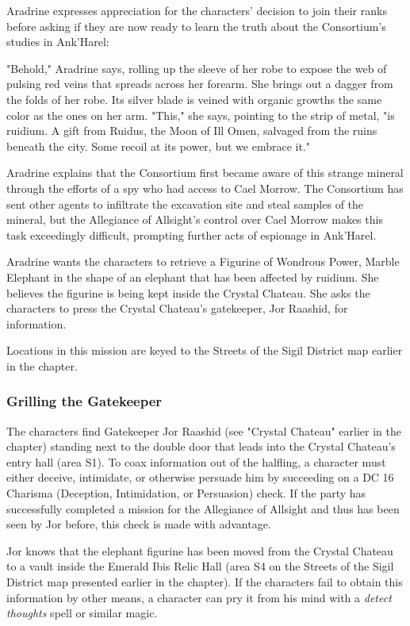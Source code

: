 \documentclass[10pt,a4paper,twoside,bg=print,twocolumn,openany,nodeprecatedcode]{dndbook}
\begin{document}
Aradrine expresses appreciation for the characters' decision to join their ranks before asking if they are now ready to learn the truth about the Consortium's studies in Ank'Harel:

\begin{DndReadAloud}{}
"Behold," Aradrine says, rolling up the sleeve of her robe to expose the web of pulsing red veins that spreads across her forearm. She brings out a dagger from the folds of her robe. Its silver blade is veined with organic growths the same color as the ones on her arm. "This," she says, pointing to the strip of metal, "is ruidium. A gift from Ruidus, the Moon of Ill Omen, salvaged from the ruins beneath the city. Some recoil at its power, but we embrace it."

\end{DndReadAloud}

Aradrine explains that the Consortium first became aware of this strange mineral through the efforts of a spy who had access to Cael Morrow. The Consortium has sent other agents to infiltrate the excavation site and steal samples of the mineral, but the Allegiance of Allsight's control over Cael Morrow makes this task exceedingly difficult, prompting further acts of espionage in Ank'Harel.

Aradrine wants the characters to retrieve a Figurine of Wondrous Power, Marble Elephant in the shape of an elephant that has been affected by ruidium. She believes the figurine is being kept inside the Crystal Chateau. She asks the characters to press the Crystal Chateau's gatekeeper, Jor Raashid, for information.

Locations in this mission are keyed to the Streets of the Sigil District map earlier in the chapter.

\subsubsection{Grilling the Gatekeeper}
The characters find Gatekeeper Jor Raashid (see "Crystal Chateau" earlier in the chapter) standing next to the double door that leads into the Crystal Chateau's entry hall (area S1). To coax information out of the halfling, a character must either deceive, intimidate, or otherwise persuade him by succeeding on a DC 16 Charisma (Deception, Intimidation, or Persuasion) check. If the party has successfully completed a mission for the Allegiance of Allsight and thus has been seen by Jor before, this check is made with advantage.

Jor knows that the elephant figurine has been moved from the Crystal Chateau to a vault inside the Emerald Ibis Relic Hall (area S4 on the Streets of the Sigil District map presented earlier in the chapter). If the characters fail to obtain this information by other means, a character can pry it from his mind with a \textit{detect thoughts} spell or similar magic.
\end{document}
